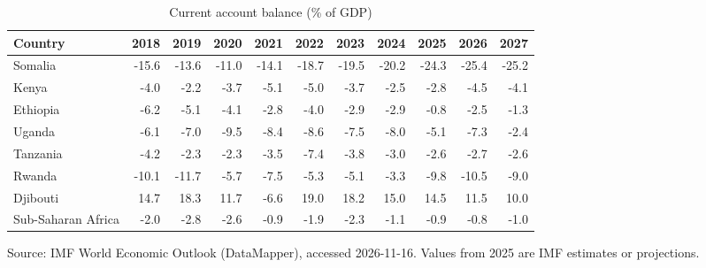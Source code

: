 \begin{table}[htbp]\centering
\caption{Current account balance (\% of GDP)}
\begin{tabular}{lrrrrrrrrrr}
\toprule
Country & 2018 & 2019 & 2020 & 2021 & 2022 & 2023 & 2024 & 2025 & 2026 & 2027 \\
\midrule
Somalia & -15.6 & -13.6 & -11.0 & -14.1 & -18.7 & -19.5 & -20.2 & -24.3 & -25.4 & -25.2 \\
Kenya & -4.0 & -2.2 & -3.7 & -5.1 & -5.0 & -3.7 & -2.5 & -2.8 & -4.5 & -4.1 \\
Ethiopia & -6.2 & -5.1 & -4.1 & -2.8 & -4.0 & -2.9 & -2.9 & -0.8 & -2.5 & -1.3 \\
Uganda & -6.1 & -7.0 & -9.5 & -8.4 & -8.6 & -7.5 & -8.0 & -5.1 & -7.3 & -2.4 \\
Tanzania & -4.2 & -2.3 & -2.3 & -3.5 & -7.4 & -3.8 & -3.0 & -2.6 & -2.7 & -2.6 \\
Rwanda & -10.1 & -11.7 & -5.7 & -7.5 & -5.3 & -5.1 & -3.3 & -9.8 & -10.5 & -9.0 \\
Djibouti & 14.7 & 18.3 & 11.7 & -6.6 & 19.0 & 18.2 & 15.0 & 14.5 & 11.5 & 10.0 \\
Sub-Saharan Africa & -2.0 & -2.8 & -2.6 & -0.9 & -1.9 & -2.3 & -1.1 & -0.9 & -0.8 & -1.0 \\
\bottomrule
\end{tabular}
\par\smallskip\footnotesize Source: IMF World Economic Outlook (DataMapper), accessed 2026-11-16. Values from 2025 are IMF estimates or projections.
\end{table}
